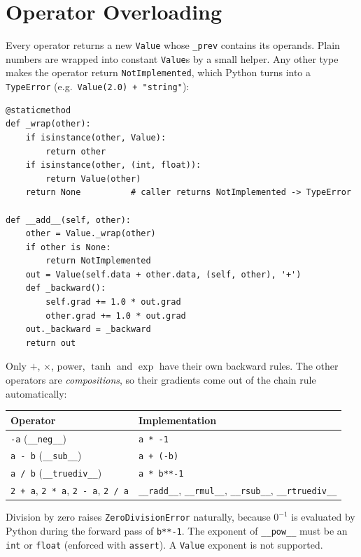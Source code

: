 \documentclass[11pt,a4paper]{article}
\begin{document}
\section{Operator Overloading}
Every operator returns a new \texttt{Value} whose \texttt{\_prev} contains its operands. Plain numbers are
wrapped into constant \texttt{Value}s by a small helper. Any other type makes the operator return
\texttt{NotImplemented}, which Python turns into a \texttt{TypeError} (e.g.\ \texttt{Value(2.0) + "string"}):
\begin{lstlisting}
@staticmethod
def _wrap(other):
    if isinstance(other, Value):
        return other
    if isinstance(other, (int, float)):
        return Value(other)
    return None          # caller returns NotImplemented -> TypeError

def __add__(self, other):
    other = Value._wrap(other)
    if other is None:
        return NotImplemented
    out = Value(self.data + other.data, (self, other), '+')
    def _backward():
        self.grad += 1.0 * out.grad
        other.grad += 1.0 * out.grad
    out._backward = _backward
    return out
\end{lstlisting}
Only $+$, $\times$, power, $\tanh$ and $\exp$ have their own backward rules. The other operators are
\emph{compositions}, so their gradients come out of the chain rule automatically:
\begin{center}
\begin{tabular}{ll}
\toprule
Operator & Implementation \\
\midrule
\texttt{-a} (\texttt{\_\_neg\_\_}) & \texttt{a * -1} \\
\texttt{a - b} (\texttt{\_\_sub\_\_}) & \texttt{a + (-b)} \\
\texttt{a / b} (\texttt{\_\_truediv\_\_}) & \texttt{a * b**-1} \\
\texttt{2 + a}, \texttt{2 * a}, \texttt{2 - a}, \texttt{2 / a} & \texttt{\_\_radd\_\_}, \texttt{\_\_rmul\_\_}, \texttt{\_\_rsub\_\_}, \texttt{\_\_rtruediv\_\_} \\
\bottomrule
\end{tabular}
\end{center}
Division by zero raises \texttt{ZeroDivisionError} naturally, because $0^{-1}$ is evaluated by Python
during the forward pass of \texttt{b**-1}. The exponent of \texttt{\_\_pow\_\_} must be an \texttt{int}
or \texttt{float} (enforced with \texttt{assert}). A \texttt{Value} exponent is not supported.
\end{document}
